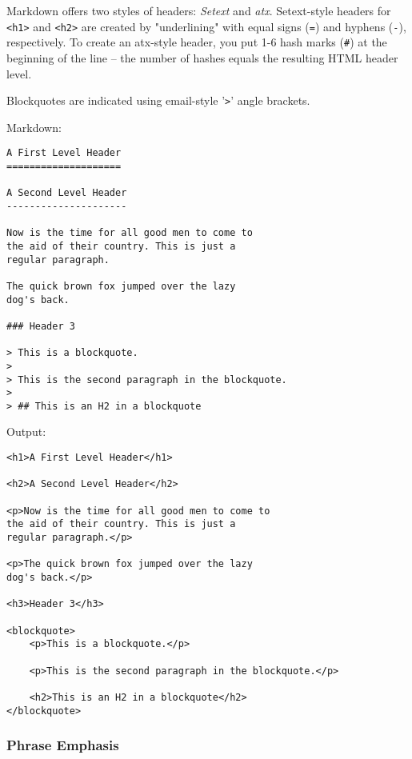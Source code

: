 Markdown offers two styles of headers: \emph{Setext} and \emph{atx}.
Setext-style headers for \texttt{<h1>} and \texttt{<h2>} are created by
"underlining" with equal signs (\texttt{=}) and hyphens (\texttt{-}), respectively.
To create an atx-style header, you put 1-6 hash marks (\texttt{\#}) at the
beginning of the line -- the number of hashes equals the resulting
HTML header level.



Blockquotes are indicated using email-style '\texttt{>}' angle brackets.



Markdown:

\begin{lstlisting}
A First Level Header
====================

A Second Level Header
---------------------

Now is the time for all good men to come to
the aid of their country. This is just a
regular paragraph.

The quick brown fox jumped over the lazy
dog's back.

### Header 3

> This is a blockquote.
> 
> This is the second paragraph in the blockquote.
>
> ## This is an H2 in a blockquote
\end{lstlisting}




Output:

\begin{lstlisting}
<h1>A First Level Header</h1>

<h2>A Second Level Header</h2>

<p>Now is the time for all good men to come to
the aid of their country. This is just a
regular paragraph.</p>

<p>The quick brown fox jumped over the lazy
dog's back.</p>

<h3>Header 3</h3>

<blockquote>
    <p>This is a blockquote.</p>

    <p>This is the second paragraph in the blockquote.</p>

    <h2>This is an H2 in a blockquote</h2>
</blockquote>
\end{lstlisting}


\subsubsection*{Phrase Emphasis}




